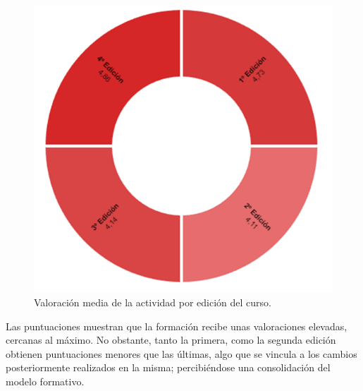 \documentclass[spanish]{textolivre}
\begin{document}
\begin{figure}
    \centering
    \begin{minipage}{0.6\linewidth}
    \includegraphics[width=\linewidth]{Fig3.png}
    \caption{Valoración media de la actividad por edición del curso.}
    \label{fig3}
    \end{minipage}
\end{figure}

Las puntuaciones muestran que la formación recibe unas valoraciones elevadas, cercanas al máximo. No obstante, tanto la primera, como la segunda edición obtienen puntuaciones menores que las últimas, algo que se vincula a los cambios posteriormente realizados en la misma; percibiéndose una consolidación del modelo formativo.
\end{document}
